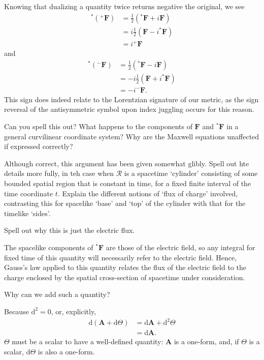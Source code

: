 \documentclass[../road-to-reality.tex]{subfiles}
\begin{document}
\begin{questions}
\begin{solution}
    Knowing that dualizing a quantity twice returns negative the original, we see
    \begin{align*}
      {}^*({}^+\mathbf{F}) &= \frac{1}{2}({}^*\mathbf{F} + i\mathbf{F}) \\
                           &= i\frac{1}{2}(\mathbf{F} - i^*\mathbf{F}) \\
                           &= i^+\mathbf{F}
    \end{align*}
    and
    \begin{align*}
      {}^*({}^-\mathbf{F}) &= \frac{1}{2}({}^*\mathbf{F} - i\mathbf{F}) \\
                           &= -i\frac{1}{2}(\mathbf{F} + i^*\mathbf{F}) \\
                           &= -i^-\mathbf{F}.
    \end{align*}
    This sign does indeed relate to the Lorentzian signature of our metric, as
    the sign reversal of the antisymmetric symbol upon index juggling occurs
    for this reason.
  \end{solution}

\question Can you spell this out? What happens to the components of $\mathbf{F}$ and ${}^*\mathbf{F}$ in a general curvilinear coordinate system? Why are the Maxwell equations unaffected if expressed correctly?

\question Although correct, this argument has been given somewhat glibly.
  Spell out hte details more fully, in teh case when $\mathcal{R}$ is a
  spacetime `cylinder' consisting of some bounded spatial region that is
  constant in time, for a fixed finite interval of the time coordinate $t$.
  Explain the different notions of `flux of charge' involved, contrasting this
  for spacelike `base' and `top' of the cylinder with that for the timelike
  `sides'.

\question Spell out why this is just the electric flux.

  \begin{solution}
    The spacelike components of ${}^*\mathbf{F}$ are those of the electric
    field, so any integral for fixed time of this quantity will necessarily
    refer to the electric field. Hence, Gauss's law applied to this quantity
    relates the flux of the electric field to the charge enclosed by the
    spatial cross-section of spacetime under consideration.
  \end{solution}

\question Why can we add such a quantity?

  \begin{solution}
    Because $\mathrm{d}^2=0$, or, explicitly,
    \begin{align*}
      \mathrm{d}(\mathbf{A} + \mathrm{d}\Theta) &= \mathrm{d}\mathbf{A} + \mathrm{d}^2\Theta \\
                                                &= \mathrm{d}\mathbf{A}.
    \end{align*}
    $\Theta$ must be a scalar to have a well-defined quantity: $\mathbf{A}$ is a
    one-form, and, if $\Theta$ is a scalar, $\mathrm{d}\Theta$ is also a one-form. 
  \end{solution}


\end{questions}
\end{document}

